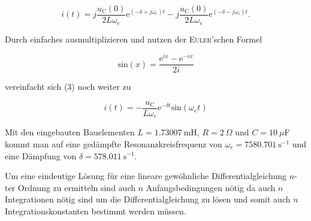 \documentclass{article}
\begin{document}
	\begin{equation}
		i(t) = j\frac{u_\mathrm{C}(0)}{2L\omega_e}\mathrm{e}^{(-\delta +j\omega_e)t} - j \frac{u_\mathrm{C}(0)}{2L\omega_e}\mathrm{e}^{(-\delta - j\omega_e)t}.
	\end{equation}
	
	Durch einfaches ausmultiplizieren und nutzen der \textsc{Euler}'schen Formel 
	
	\begin{equation*}
		\mathrm{sin}(x) = \frac{\mathrm{e}^{ix} - \mathrm{e}^{-ix}}{2i}
	\end{equation*}
	
	vereinfacht sich (3) noch weiter zu
	
	\begin{equation*}
		i(t) = -\frac{u_\mathrm{C}}{L\omega_e}\mathrm{e}^{-\delta t}\mathrm{sin}(\omega_et)
	\end{equation*}
	
	Mit den eingebauten Bauelementen $L = 1.73007\:$mH, $R = 2\:\Omega$ und $C = 10 \: \mu $F kommt man auf eine gedämpfte Resonanzkreisfrequenz von $\omega_e = 7580.701\:\mathrm{s}^{-1}$ und eine Dämpfung von $\delta = 578.011\:\mathrm{s}^{-1}$.\newline
	
	Um eine eindeutige Lösung für eine lineare gewöhnliche Differentialgleichung $n$-ter Ordnung zu ermitteln sind auch $n$ Anfangsbedingungen nötig da auch $n$ Integrationen nötig sind um die Differentialgleichung zu lösen und somit auch $n$ Integrationskonstanten bestimmt werden müssen.
	
	
\end{document}

